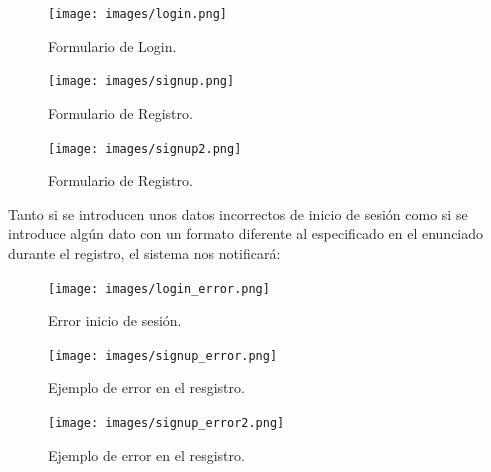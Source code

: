 \documentclass[12pt, twoside]{report}
\begin{document}
\begin{figure}[h]
\begin{center}
\texttt{[image: images/login.png]}
\end{center}
\caption{\label{inicio} Formulario de Login.}
\end{figure}
\clearpage
\begin{figure}[h]
\begin{center}
\texttt{[image: images/signup.png]}
\end{center}
\caption{\label{inicio} Formulario de Registro.}
\end{figure}
\begin{figure}[h]
\begin{center}
\texttt{[image: images/signup2.png]}
\end{center}
\caption{\label{inicio} Formulario de Registro.}
\end{figure}
\clearpage
Tanto si se introducen unos datos incorrectos de inicio de sesión como si se introduce algún dato con un formato diferente al especificado en el enunciado durante el registro, el sistema nos notificará:\\
\begin{figure}[h]
\begin{center}
\texttt{[image: images/login\_error.png]}
\end{center}
\caption{\label{inicio} Error inicio de sesión.}
\end{figure}
\begin{figure}[h]
\begin{center}
\texttt{[image: images/signup\_error.png]}
\end{center}
\caption{\label{inicio} Ejemplo de error en el resgistro.}
\end{figure}
\begin{figure}[h]
\begin{center}
\texttt{[image: images/signup\_error2.png]}
\end{center}
\caption{\label{inicio} Ejemplo de error en el resgistro.}
\end{figure}
\clearpage
\end{document}
